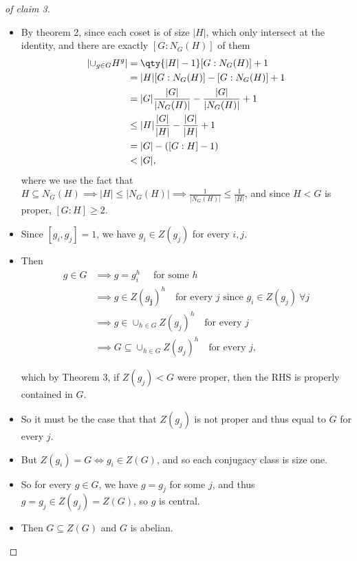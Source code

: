 \begin{solution}
\begin{proof}[of claim 3]
\begin{itemize}
\item
  By theorem 2, since each coset is of size
  \({\left\lvert {H} \right\rvert}\), which only intersect at the
  identity, and there are exactly \([G: N_G(H)]\) of them
  \begin{align*}
  {\left\lvert {\cup_{g\in G} H^g} \right\rvert} 
  &= \qty{ {\left\lvert {H} \right\rvert} - 1} [G: N_G(H)] + 1\\
  &= {\left\lvert {H} \right\rvert} [G: N_G(H)]  - [G:N_G(H)] + 1\\
  &= {\left\lvert {G} \right\rvert} \frac{{\left\lvert {G} \right\rvert}}{{\left\lvert {N_G(H)} \right\rvert}} - \frac{{\left\lvert {G} \right\rvert}}{{\left\lvert {N_G(H)} \right\rvert}} + 1 \\
  &\leq {\left\lvert {H} \right\rvert} \frac{{\left\lvert {G} \right\rvert}}{{\left\lvert {H} \right\rvert}} - \frac{{\left\lvert {G} \right\rvert}}{{\left\lvert {H} \right\rvert}} + 1 \\
  &= {\left\lvert {G} \right\rvert} - ([G: H] - 1) \\
  &< {\left\lvert {G} \right\rvert} 
  ,\end{align*}
  where we use the fact that
  \(H \subseteq N_G(H) \implies {\left\lvert {H} \right\rvert} \leq {\left\lvert {N_G(H)} \right\rvert} \implies \frac{1}{{\left\lvert {N_G(H)} \right\rvert}} \leq \frac{1}{{\left\lvert {H} \right\rvert}}\),
  and since \(H < G\) is proper, \([G:H] \geq 2\).
\item
  Since \([g_i, g_j] = 1\), we have \(g_i \in Z(g_j)\) for every
  \(i, j\).
\item
  Then
  \begin{align*}
  g\in G 
  &\implies g = g_i^h \quad \text{ for some } h \\
  &\implies g \in Z(g_\mathbf{j})^h \quad\text{for every } j \text{ since }g_i \in Z(g_j) ~\forall j \\
  &\implies g \in \cup_{h\in G} Z(g_j)^h \quad\text{for every } j\\
  &\implies G \subseteq \cup_{h\in G} Z(g_j)^h \quad\text{for every } j
  ,\end{align*}

  which by Theorem 3, if \(Z(g_j) < G\) were proper, then the RHS is
  properly contained in \(G\).
\item
  So it must be the case that that \(Z(g_j)\) is not proper and thus
  equal to \(G\) for every \(j\).
\item
  But \(Z(g_i) = G \iff g_i \in Z(G)\), and so each conjugacy class is
  size one.
\item
  So for every \(g\in G\), we have \(g = g_j\) for some \(j\), and thus
  \(g = g_j \in Z(g_j) = Z(G)\), so \(g\) is central.
\item
  Then \(G\subseteq Z(G)\) and \(G\) is abelian.
\end{itemize}

\end{proof}

\end{solution}


